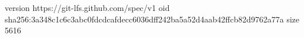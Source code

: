 version https://git-lfs.github.com/spec/v1
oid sha256:3a348c1c6c3abc0fdcdcafdecc6036dff242ba5a52d4aab42ffcb82d9762a77a
size 5616
